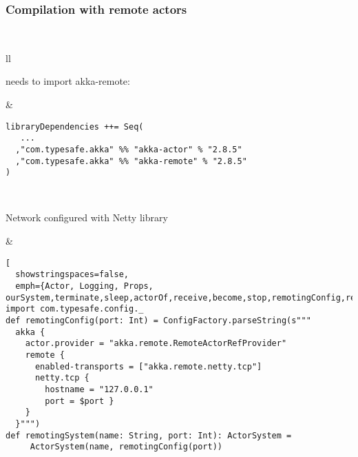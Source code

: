 \documentclass[aspectratio=169]{beamer}
\begin{document}
\begin{frame}[fragile]\frametitle{Compilation with remote actors}
~\\[-6.5mm]
\begin{tabular}{ll}
\begin{minipage}{0.18\textwidth}
  needs to import akka-remote:
\end{minipage}
&
\begin{minipage}{0.82\textwidth}
\begin{lstlisting}[emph={Actor, Logging, Props, ourSystem,terminate,sleep,actorOf,receive,become,stop}]
libraryDependencies ++= Seq(
   ...
  ,"com.typesafe.akka" %% "akka-actor" % "2.8.5"
  ,"com.typesafe.akka" %% "akka-remote" % "2.8.5"
)
\end{lstlisting}
\end{minipage}
\\
\begin{minipage}{0.18\textwidth}
  Network configured with Netty library
\end{minipage}
&
\begin{minipage}{0.82\textwidth}
\begin{lstlisting}[
  showstringspaces=false,
  emph={Actor, Logging, Props, ourSystem,terminate,sleep,actorOf,receive,become,stop,remotingConfig,remotingSystem}]
import com.typesafe.config._
def remotingConfig(port: Int) = ConfigFactory.parseString(s"""
  akka {
    actor.provider = "akka.remote.RemoteActorRefProvider"
    remote {
      enabled-transports = ["akka.remote.netty.tcp"]
      netty.tcp {
        hostname = "127.0.0.1"
        port = $port }
    }
  }""")
def remotingSystem(name: String, port: Int): ActorSystem =
     ActorSystem(name, remotingConfig(port))
\end{lstlisting}
\end{minipage}
\end{tabular}
\end{frame}
\end{document}
